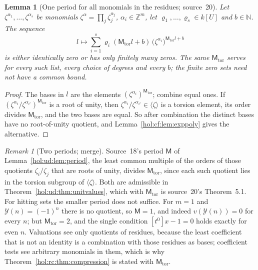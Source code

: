 \documentclass[11pt]{article}
\numberwithin{equation}{section}
\newtheorem{lemma}[theorem]{Lemma}
\theoremstyle{definition}
\theoremstyle{remark}
\newtheorem{remark}[theorem]{Remark}
\newcommand{\N}{\mathbb N}
\newcommand{\Z}{\mathbb Z}
\begin{document}
\begin{lemma}[One period for all monomials in the residues; source~20]
\label{hol:rc:lem:torperiod}
Let $\zeta^{\alpha_1},\ldots,\zeta^{\alpha_s}$ be monomials
$\zeta^\alpha=\prod_j\zeta_j^{\alpha_j}$, $\alpha_i\in\Z^m$, let
$\varrho_1,\ldots,\varrho_s\in k[U]$ and $b\in\N$. The sequence
\[
 l\longmapsto\sum_{i=1}^s\varrho_i(\mathsf M_{\mathrm{tor}}l+b)\,
 \bigl(\zeta^{\alpha_i}\bigr)^{\mathsf M_{\mathrm{tor}}l+b}
\]
is either identically zero or has only finitely many zeros. The same
$\mathsf M_{\mathrm{tor}}$ serves for every such list, every choice of degrees
and every $b$; the finite zero sets need not have a common bound.
\end{lemma}

\begin{proof}
The bases in $l$ are the elements $(\zeta^{\alpha_i})^{\mathsf M_{\mathrm{tor}}}$;
combine equal ones. If
$(\zeta^{\alpha_i}/\zeta^{\alpha_{i'}})^{\mathsf M_{\mathrm{tor}}}$ is a root of
unity, then $\zeta^{\alpha_i}/\zeta^{\alpha_{i'}}\in\langle\zeta\rangle$ is a
torsion element, its order divides $\mathsf M_{\mathrm{tor}}$, and the two bases
are equal. So after combination the distinct bases have no root-of-unity
quotient, and Lemma~\ref{hol:cf:lem:exppoly} gives the alternative.
\end{proof}

\begin{remark}[Two periods; merge]\label{hol:rc:rem:periods}
Source~18's period $\mathsf M$ of Lemma~\ref{hol:ud:lem:period}, the least
common multiple of the orders of those quotients $\zeta_i/\zeta_j$ that are
roots of unity, divides $\mathsf M_{\mathrm{tor}}$, since each such quotient
lies in the torsion subgroup of $\langle\zeta\rangle$. Both are admissible in
Theorem~\ref{hol:ud:thm:unitvalues}, which with $\mathsf M_{\mathrm{tor}}$ is
source~20's Theorem~5.1. For hitting sets the smaller period does not suffice.
For $m=1$ and $\mathcal Y(n)=(-1)^n$ there is no quotient, so $\mathsf M=1$,
and indeed $v(\mathcal Y(n))=0$ for every $n$; but $\mathsf M_{\mathrm{tor}}=2$,
and the single condition $[t^0]x-1=0$ holds exactly for even $n$. Valuations
see only quotients of residues, because the least coefficient that is not an
identity is a combination with those residues as bases; coefficient tests see
arbitrary monomials in them, which is why
Theorem~\ref{hol:rc:thm:compression} is stated with
$\mathsf M_{\mathrm{tor}}$.
\end{remark}
\end{document}
